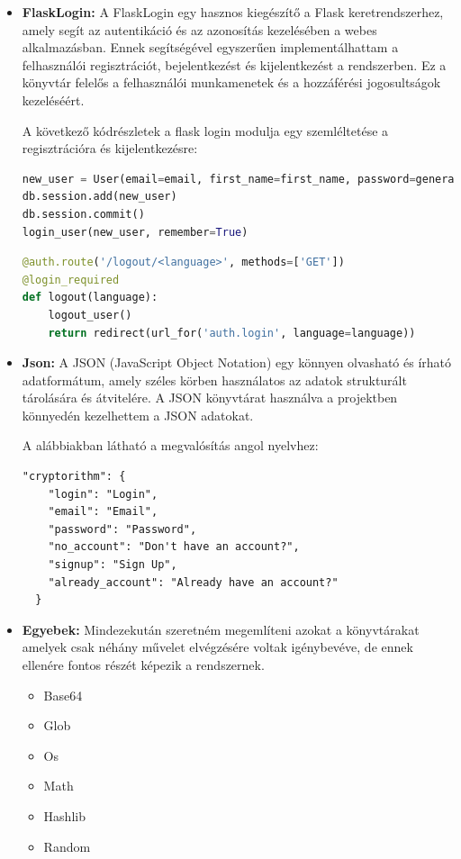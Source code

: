 \begin{itemize}
\pagebreak
 	 \item\textbf{FlaskLogin:}
A FlaskLogin egy hasznos kiegészítő a Flask keretrendszerhez, amely segít az autentikáció és az azonosítás kezelésében a webes alkalmazásban. Ennek segítségével egyszerűen implementálhattam a felhasználói regisztrációt, bejelentkezést és kijelentkezést a rendszerben. Ez a könyvtár felelős a felhasználói munkamenetek és a hozzáférési jogosultságok kezeléséért.

A következő kódrészletek a flask login modulja egy szemléltetése a regisztrációra és kijelentkezésre:
\begin{lstlisting}[caption={Flask bejelentkezés kódrészlet}, captionpos=b, language = Python]
new_user = User(email=email, first_name=first_name, password=generate_password_hash(password1, method='sha256'))
db.session.add(new_user)
db.session.commit()
login_user(new_user, remember=True)
\end{lstlisting}

\begin{lstlisting}[caption={Flask kijelentkezés kódrészlet}, captionpos=b, language = Python]
@auth.route('/logout/<language>', methods=['GET'])
@login_required
def logout(language):
    logout_user()
    return redirect(url_for('auth.login', language=language))
\end{lstlisting}

 	 \item\textbf{Json:}
A JSON (JavaScript Object Notation) egy könnyen olvasható és írható adatformátum, amely széles körben használatos az adatok strukturált tárolására és átvitelére. A JSON könyvtárat használva a projektben könnyedén kezelhettem a JSON adatokat.

A alábbiakban látható a megvalósítás angol nyelvhez:
\begin{lstlisting}[caption={JSON angol kódrészlet}, captionpos=b]
"cryptorithm": {
    "login": "Login",
    "email": "Email",
    "password": "Password",
    "no_account": "Don't have an account?",
    "signup": "Sign Up",
    "already_account": "Already have an account?"
  }
\end{lstlisting}

\pagebreak
	 \item\textbf{Egyebek:}
Mindezekután szeretném megemlíteni azokat a könyvtárakat amelyek csak néhány művelet elvégzésére voltak igénybevéve, de ennek ellenére fontos részét képezik a rendszernek.
\begin{itemize}
 	 \item{Base64}
 	 \item{Glob}
 	 \item{Os}
 	 \item{Math}
 	 \item{Hashlib}
 	 \item{Random}
\end{itemize}
\end{itemize}


